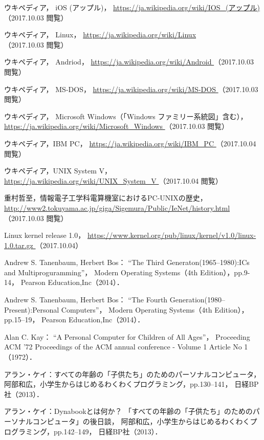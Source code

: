 \begin{thebibliography}{9}
ウキペディア，
iOS (アップル)，
\url{
https://ja.wikipedia.org/wiki/IOS_(アップル)
}（2017.10.03 閲覧）

ウキペディア，
Linux，
\url{
https://ja.wikipedia.org/wiki/Linux
}（2017.10.03 閲覧）

ウキペディア，
Andriod，
\url{
https://ja.wikipedia.org/wiki/Android
}（2017.10.03 閲覧）

ウキペディア，
MS-DOS，
\url{
https://ja.wikipedia.org/wiki/MS-DOS
}（2017.10.03 閲覧）

ウキペディア，
Microsoft Windows（「Windows ファミリー系統図」含む），
\url{
https://ja.wikipedia.org/wiki/Microsoft_Windows
}（2017.10.03 閲覧）

ウキペディア，IBM PC，
\url{
https://ja.wikipedia.org/wiki/IBM_PC
}（2017.10.04 閲覧）

ウキペディア，UNIX System V，
\url{
https://ja.wikipedia.org/wiki/UNIX_System_V
}（2017.10.04 閲覧）

重村哲至，情報電子工学科電算機室におけるPC-UNIXの歴史，
\url{
http://www2.tokuyama.ac.jp/giga/Sigemura/Public/IeNet/history.html
}（2017.10.03 閲覧）

Linux kernel release 1.0，
\url{
https://www.kernel.org/pub/linux/kernel/v1.0/linux-1.0.tar.gz
}（2017.10.04）

Andrew S. Tanenbaum, Herbert Bos：
``The Third Generaton(1965--1980):ICs and Multiproguramming''，
Modern Operating Systems（4th Edition），pp.9-14，
Pearson Education,Inc（2014）．

Andrew S. Tanenbaum, Herbert Bos：
``The Fourth Generation(1980--Present):Personal Computers''，
Modern Operating Systems（4th Edition），pp.15--19，
Pearson Education,Inc（2014）．

Alan C. Kay：
``A Personal Computer for Children of All Ages''，
Proceeding ACM '72 Proceedings of the ACM annual conference - Volume 1
Article No 1 （1972）．

アラン・ケイ：すべての年齢の「子供たち」のためのパーソナルコンピュータ，
阿部和広，小学生からはじめるわくわくプログラミング，pp.130--141，
日経BP社（2013）．

アラン・ケイ：Dynabookとは何か？
「すべての年齢の「子供たち」のためのパーソナルコンピュータ」の後日談，
阿部和広，小学生からはじめるわくわくプログラミング，pp.142--149，
日経BP社（2013）．


\end{thebibliography}
